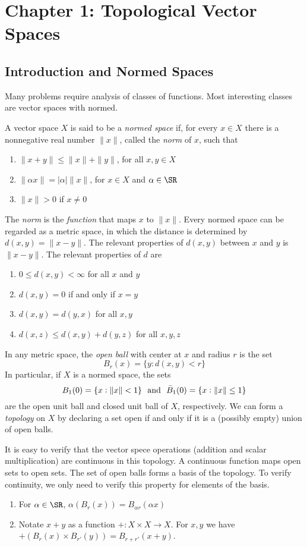 
\section{Chapter 1: Topological Vector Spaces}

\subsection{Introduction and Normed Spaces}

Many problems require analysis of classes of functions. Most interesting classes are vector spaces with normed. 

A vector space $X$ is said to be a \emph{normed space} if, for every $x\in X$ there is a nonnegative real number $\|x\|$, called the \emph{norm} of $x$, such that
\begin{enumerate}
	\item \(\|x+y\| \leq \|x\| + \|y\|\), for all $x,y \in X$
	\item \(\|\alpha x\| = |\alpha|\|x\|\), for $x \in X$ and $\alpha \in \SR$
	\item \(\|x\| > 0\) if $x\neq 0$
\end{enumerate}
The \emph{norm} is the \emph{function} that maps $x$ to $\|x\|$. Every normed space can be regarded as a metric space, in which the distance is determined by  $d(x,y) = \|x-y\|$. The relevant properties of $d(x,y)$ between $x$ and $y$ is $\|x-y\|$. The relevant properties of $d$ are 
\begin{enumerate}
	\item \(0 \leq d(x,y) < \infty\) for all $x$ and $y$
	\item \(d(x,y) = 0\) if and only if $x = y$
	\item \(d(x,y) = d(y,x)\) for all $x,y$
	\item \(d(x,z) \leq d(x,y) + d(y,z)\) for all \(x,y,z\) 
\end{enumerate}
In any metric space, the \emph{open ball} with center at \(x\) and radius \(r\) is the set 
\[B_r(x) = \{y: d(x,y) < r\}\]
In particular, if $X$ is a normed space, the sets 
\[B_1(0) = \{x: \|x\| < 1\}\hbox{ }\text{ and }\hbox{ }\bar{B}_1(0) = \{x: \|x\|\leq 1\}\]
are the open unit ball and closed unit ball of $X$, respectively. We can form a \emph{topology} on $X$ by declaring a set open if and only if it is a (possibly empty) union of open balls. 
\begin{comment*}
	It is easy to verify that the vector spece operations (addition and scalar multiplication) are continuous in this topology. A continuous function maps open sets to open sets. The set of open balls forms a basis of the topology. To verify continuity, we only need to verify this property for elements of the basis. 
	\begin{enumerate}
	 	\item For $\alpha \in \SR$, $\alpha(B_r(x)) = B_{\alpha r}(\alpha x)$
	 	\item Notate $x + y$ as a function $+: X\times X \to X$. For $x,y$ we have $+(B_r(x) \times B_{r'}(y)) = B_{r+r'}(x+y)$.
	 \end{enumerate} 
\end{comment*}
